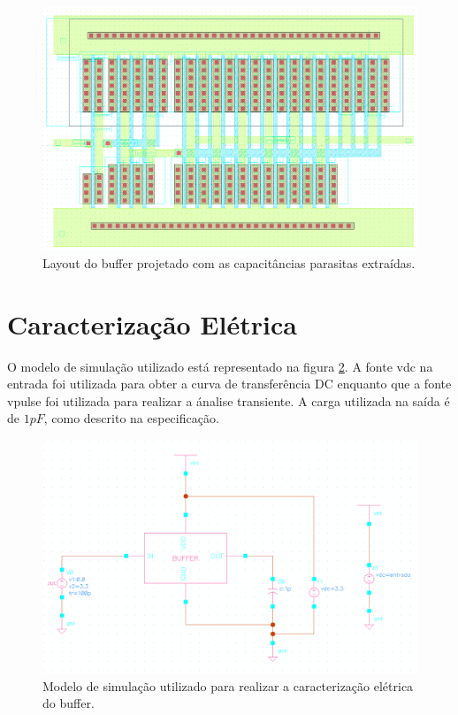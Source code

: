 \documentclass[a4paper,10pt] {article}
\begin{document}
\begin{figure} [h]
	\label{fig:extraido}
	\centering
	\includegraphics[scale=0.2]{extraido_buffer.png}
	\caption{Layout do buffer projetado com as capacitâncias parasitas extraídas.}
\end{figure}

\section{Caracterização Elétrica}
\label{sec:caracterizacao}
O modelo de simulação utilizado está representado na figura \ref{fig:teste}. A fonte vdc na entrada foi utilizada para obter a curva de transferência DC enquanto que a fonte vpulse foi utilizada para realizar a ánalise transiente. A carga utilizada na saída é de $1pF$, como descrito na especificação.

\begin{figure} [h]
	\label{fig:teste}
	\centering
	\includegraphics[scale=0.15]{teste_buffer.png}
	\caption{Modelo de simulação utilizado para realizar a caracterização elétrica do buffer.}
\end{figure}
\end{document}
